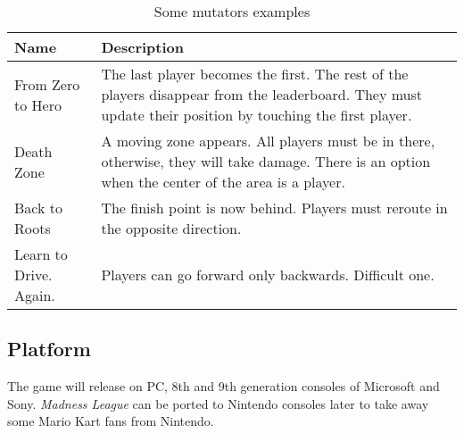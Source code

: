 \documentclass[a4paper,10pt,english]{article}
\begin{document}
\begin{table}[h]
	\centering
	\begin{tabular}{
			p{}
			p{}}
		\textbf{Name}          & \textbf{Description}                   \\ \hline
		From Zero to Hero      & The last player becomes the first.
		The rest of the players disappear from the leaderboard.
		They must update their position by touching the first player.   \\ \hline
		Death Zone             & A moving zone appears.
		All players must be in there, otherwise, they will take damage.
		There is an option when the center of the area is a player.     \\ \hline
		Back to Roots          & The finish point is now behind.
		Players must reroute in the opposite direction.                 \\ \hline
		Learn to Drive. Again. & Players can go forward only backwards.
		Difficult one.                                                  \\ \hline
	\end{tabular}
	\caption{Some mutators examples}
	\label{tab:mutators}
\end{table}

\subsection*{Platform}
The game will release on PC, 8th and 9th generation consoles of Microsoft and Sony.
\emph{Madness League} can be ported to Nintendo consoles later to take away some Mario Kart fans from Nintendo.
\end{document}
